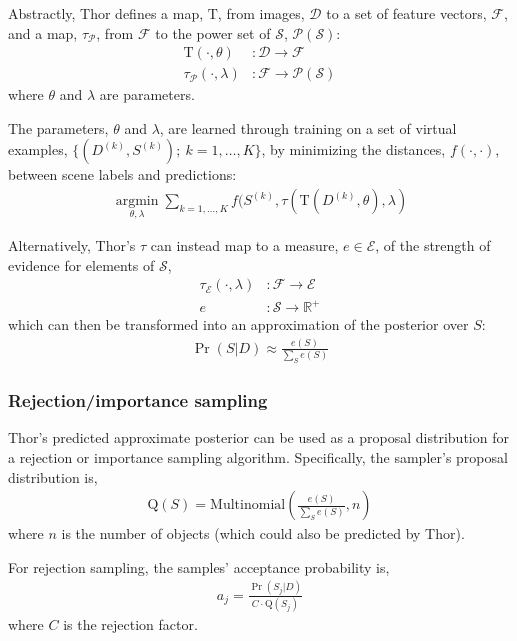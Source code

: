 \documentclass[]{report}
\begin{document}
Abstractly, Thor defines a map, $\mathrm{T}$, from images,
$\mathcal{D}$ to a set of feature vectors, $\mathcal{F}$, and a map,
$\tau_{\mathcal{P}}$, from $\mathcal{F}$ to the power set of $\mathcal{S}$,
$\mathcal{P}(\mathcal{S})$:
\begin{align*}
  \mathrm{T}(\cdot, \theta) &: \mathcal{D} \rightarrow \mathcal{F}\\
  \tau_{\mathcal{P}}(\cdot, \lambda) &: \mathcal{F} \rightarrow \mathcal{P}(\mathcal{S})
\end{align*}
where $\theta$ and $\lambda$ are parameters.

The parameters, $\theta$ and $\lambda$, are learned through training
on a set of virtual examples, $\{(D^{(k)}, S^{(k)});\ k=1, \dots,
K\}$, by minimizing the distances, $f(\cdot,\cdot)$, between scene
labels and predictions:
\begin{align*}
  \underset{\theta, \lambda}{\operatorname{argmin}} \sum_{k=1, \dots, K}
  f(S^{(k)}, \tau(\mathrm{T}(D^{(k)}, \theta), \lambda)
\end{align*}

Alternatively, Thor's $\tau$ can instead map to a measure, $e \in
\mathcal{E}$, of the strength of evidence for elements of $\mathcal{S}$, 
\begin{align*}
  \tau_{\mathcal{E}}(\cdot, \lambda) &: \mathcal{F} \rightarrow \mathcal{E}\\
  e &: \mathcal{S} \rightarrow \mathbb{R}^+
\end{align*}
which can then be transformed into an approximation of the posterior
over $S$:
\begin{align*}
  \Pr(S|D) \approx \frac{e(S)}{\sum_S e(S)}
\end{align*}

\subsubsection*{Rejection/importance sampling}
Thor's predicted approximate posterior can be used as a proposal
distribution for a rejection or importance sampling
algorithm. Specifically, the sampler's proposal distribution is,
\begin{align*}
  \mathrm{Q}(S) =
  \mathrm{Multinomial}\left(\frac{e(S)}{\sum_S e(S)} , n
  \right)
\end{align*}
where $n$ is the number of objects (which could also be predicted by
Thor).

For rejection sampling, the samples' acceptance probability is,
\begin{align*}
  a_j = \frac{\Pr(S_j | D)}{C \cdot \mathrm{Q}(S_j)}
\end{align*}
where $C$ is the rejection factor.
\end{document}
